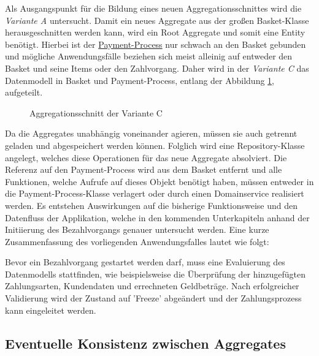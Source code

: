 Als Ausgangspunkt für die Bildung eines neuen Aggregationsschnittes wird die \emph{Variante A} untersucht. Damit ein neues Aggregate aus der großen Basket-Klasse herausgeschnitten werden kann, wird ein Root Aggregate und somit eine Entity benötigt. Hierbei ist der \ul{Payment-Process} nur schwach an den Basket gebunden und mögliche Anwendungsfälle beziehen sich meist alleinig auf entweder den Basket und seine Items oder den Zahlvorgang. Daher wird in der \emph{Variante C} das Datenmodell in Basket und Payment-Process, entlang der Abbildung \ref{fig:VarC}, aufgeteilt. 

\begin{figure}[htbp]
	\centering
	
	\caption{Aggregationsschnitt der Variante C}
	\label{fig:VarC}
\end{figure}

Da die Aggregates unabhängig voneinander agieren, müssen sie auch getrennt geladen und abgespeichert werden können. Folglich wird eine Repository-Klasse angelegt, welches diese Operationen für das neue Aggregate absolviert. Die Referenz auf den Payment-Process wird aus dem Basket entfernt und alle Funktionen, welche Aufrufe auf dieses Objekt benötigt haben, müssen entweder in die Payment-Process-Klasse verlagert oder durch einen Domainservice realisiert werden. Es entstehen Auswirkungen auf die bisherige Funktionsweise und den Datenfluss der Applikation, welche in den kommenden Unterkapiteln anhand der Initiierung des Bezahlvorgangs genauer untersucht werden. Eine kurze Zusammenfassung des vorliegenden Anwendungsfalles lautet wie folgt:

Bevor ein Bezahlvorgang gestartet werden darf, muss eine Evaluierung des Datenmodells stattfinden, wie beispielsweise die Überprüfung der hinzugefügten Zahlungsarten, Kundendaten und errechneten Geldbeträge. Nach erfolgreicher Validierung wird der Zustand auf 'Freeze' abgeändert und der Zahlungsprozess kann eingeleitet werden.

\subsection{Eventuelle Konsistenz zwischen Aggregates}

